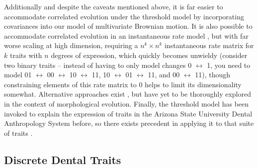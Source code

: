 \documentclass[10pt, twocolumn, twoside]{article}
\begin{document}
Additionally and despite the caveats mentioned above, it is far easier to accommodate correlated evolution under the threshold model by incorporating covariances into our model of multivariate Brownian motion. It is also possible to accommodate correlated evolution in an instantaneous rate model \citep{pagelDetectingCorrelatedEvolution1994, pagelBayesianAnalysisCorrelated2006}, but with far worse scaling at high dimension, requiring a $n^k \times n^k$ instantaneous rate matrix for $k$ traits with $n$ degrees of expression, which quickly becomes unwieldy (consider two binary traits – instead of having to only model changes 0 $\leftrightarrow$ 1, you need to model 01 $\leftrightarrow$ 00 $\leftrightarrow$ 10 $\leftrightarrow$ 11, 10 $\leftrightarrow$ 01 $\leftrightarrow$ 11, and 00 $\leftrightarrow$ 11), though constraining elements of this rate matrix to 0 helps to limit its dimensionality somewhat. Alternative approaches exist \citep{robinsonProteinEvolutionDependence2003, rodrigueSiteInterdependenceAttributed2005, rodrigueAssessingSiteinterdependentPhylogenetic2006}, but have yet to be thoroughly explored in the context of morphological evolution. Finally, the threshold model has been invoked to explain the expression of traits in the Arizona State University Dental Anthropology System \citep[ASUDAS;][]{turnerScoringProducesKey1991} before, so there exists precedent in applying it to that suite of traits \citep{scottAnthropologyModernHuman2018}.  

\subsection{Discrete Dental Traits}
\end{document}
